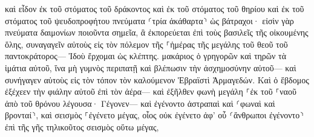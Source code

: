 \documentclass{openreader}
\begin{document}
καὶ εἶδον ἐκ τοῦ στόματος τοῦ δράκοντος καὶ ἐκ τοῦ στόματος τοῦ θηρίου καὶ ἐκ τοῦ στόματος τοῦ ψευδοπροφήτου πνεύματα ⸂τρία ἀκάθαρτα⸃ ὡς βάτραχοι· 
εἰσὶν γὰρ πνεύματα δαιμονίων ποιοῦντα σημεῖα, ἃ ἐκπορεύεται ἐπὶ τοὺς βασιλεῖς τῆς οἰκουμένης ὅλης, συναγαγεῖν αὐτοὺς εἰς τὸν πόλεμον τῆς ⸀ἡμέρας τῆς μεγάλης τοῦ θεοῦ τοῦ παντοκράτορος— 
Ἰδοὺ ἔρχομαι ὡς κλέπτης. μακάριος ὁ γρηγορῶν καὶ τηρῶν τὰ ἱμάτια αὐτοῦ, ἵνα μὴ γυμνὸς περιπατῇ καὶ βλέπωσιν τὴν ἀσχημοσύνην αὐτοῦ— 
καὶ συνήγαγεν αὐτοὺς εἰς τὸν τόπον τὸν καλούμενον Ἑβραϊστὶ Ἁρμαγεδών. 
Καὶ ὁ ἕβδομος ἐξέχεεν τὴν φιάλην αὐτοῦ ἐπὶ τὸν ἀέρα— καὶ ἐξῆλθεν φωνὴ μεγάλη ⸀ἐκ τοῦ ⸀ναοῦ ἀπὸ τοῦ θρόνου λέγουσα· Γέγονεν— 
καὶ ἐγένοντο ἀστραπαὶ καὶ ⸂φωναὶ καὶ βρονταί⸃, καὶ σεισμὸς ⸀ἐγένετο μέγας, οἷος οὐκ ἐγένετο ἀφ’ οὗ ⸂ἄνθρωποι ἐγένοντο⸃ ἐπὶ τῆς γῆς τηλικοῦτος σεισμὸς οὕτω μέγας, 
\end{document}
